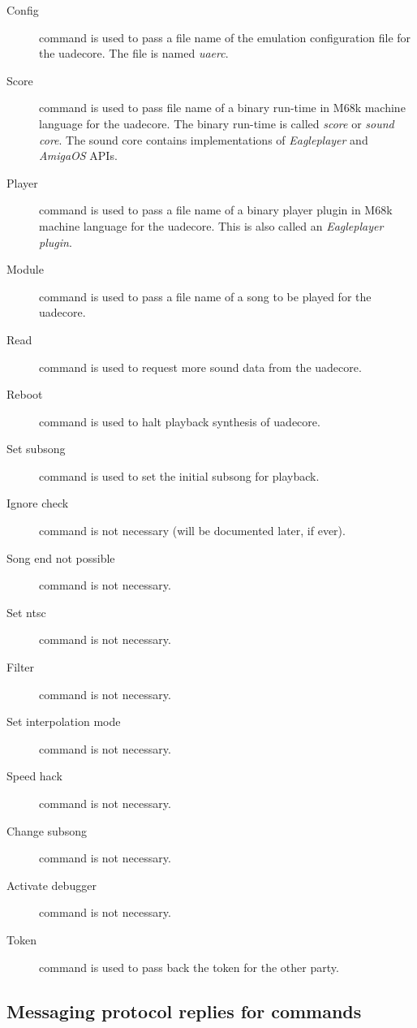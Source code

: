\documentclass{article}
\begin{document}
\begin{description}
\item [Config] command is used to pass a file name of the emulation
configuration file for the uadecore. The file is named \emph{uaerc}.

\item [Score] command is used to pass file name of a binary run-time in M68k
machine language for the uadecore. The binary run-time is called
\emph{score} or \emph{sound core}. The sound core contains implementations of
\emph{Eagleplayer} and \emph{AmigaOS} APIs.

\item [Player] command is used to pass a file name of a binary player plugin
in M68k machine language for the uadecore. This is also called an
\emph{Eagleplayer plugin}.

\item [Module] command is used to pass a file name of a song to be played
for the uadecore.

\item [Read] command is used to request more sound data from the uadecore.

\item [Reboot] command is used to halt playback synthesis of uadecore.

\item [Set subsong] command is used to set the initial subsong for playback.

\item [Ignore check] command is not necessary (will be documented later,
if ever).
\item [Song end not possible] command is not necessary.
\item [Set ntsc] command is not necessary.
\item [Filter] command is not necessary.
\item [Set interpolation mode] command is not necessary.
\item [Speed hack] command is not necessary.
\item [Change subsong] command is not necessary.
\item [Activate debugger] command is not necessary.

\item [Token] command is used to pass back the token for the other party.
\end{description}

\subsection{Messaging protocol replies for commands}
\end{document}
